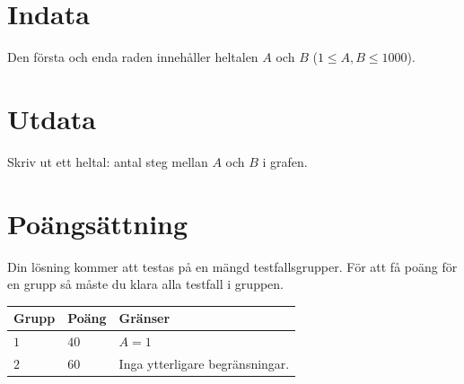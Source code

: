 \section*{Indata}
Den första och enda raden innehåller heltalen $A$ och $B$ ($1\leq A,B \leq 1000$).

\section*{Utdata}
Skriv ut ett heltal: antal steg mellan $A$ och $B$ i grafen.

\section*{Poängsättning}
Din lösning kommer att testas på en mängd testfallsgrupper.
För att få poäng för en grupp så måste du klara alla testfall i gruppen.

\noindent
\begin{tabular}{| l | l | p{12cm} |}
  \hline
  \textbf{Grupp} & \textbf{Poäng} & \textbf{Gränser} \\ \hline
  $1$    & $40$       & $A=1$ \\ \hline
  $2$    & $60$       & Inga ytterligare begränsningar. \\ \hline
\end{tabular}


